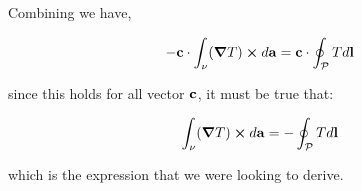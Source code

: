 \documentclass{article}
\numberwithin{equation}{section}
\begin{document}
Combining we have, 

\begin{equation}
    - \vb{c} \cdot  \int_\nu (\grad T)  \cross d \vb{a} = \vb{c} \cdot \oint_\mathcal{P} T d \vb{l}
\end{equation}

since this holds for all vector $\vb{c}$, it must be true that:

\begin{equation}
    \int_\nu (\grad T)  \cross d \vb{a} = -\oint_\mathcal{P} T d \vb{l}
\end{equation}

which is the expression that we were looking to derive.
\end{document}
